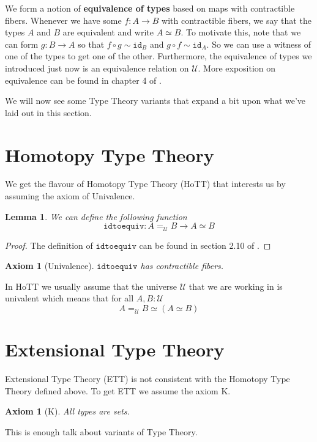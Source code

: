 \documentclass[12pt]{report}
\newtheorem{lem}[thm]{Lemma}
\newtheorem{axiom}[thm]{Axiom}
\begin{document}
 	We form a notion of \textbf{equivalence of types} based on maps with contractible fibers. 
 	Whenever we have some $f : A\rightarrow B$ with contractible fibers, we say that the types $A$ and $B$ are equivalent and write $A \simeq B$. 
 	To motivate this, note that we can form $g : B \rightarrow A$ so that $f\circ g \sim \mathtt{id}_B$ and $g\circ f \sim \mathtt{id}_A$. 
 	So we can use a witness of one of the types to get one of the other. 
 	Furthermore, the equivalence of types we introduced just now is an equivalence relation on $\mathcal{U}$. 
 	More exposition on equivalence can be found in chapter 4 of \cite{hottbook}.

 	We will now see some Type Theory variants that expand a bit upon what we've laid out in this section.

\section{Homotopy Type Theory}
We get the flavour of Homotopy Type Theory (HoTT) that interests us by assuming the axiom of Univalence.
\begin{lem}
We can define the following function
$$\mathtt{idtoequiv} : A=_\mathcal{U}B \rightarrow A\simeq B$$
\end{lem}
\begin{proof}
The definition of $\mathtt{idtoequiv}$ can be found in section 2.10 of \cite{hottbook}. 
\end{proof}

\begin{axiom}[Univalence]
$\mathtt{idtoequiv}$ has contractible fibers.
\end{axiom}
In HoTT we usually assume that the universe $\mathcal{U}$ that we are working in is univalent which means that for all $A,B: \mathcal{U}$
$$A=_\mathcal{U}B \simeq (A \simeq B)$$

\section{Extensional Type Theory}
Extensional Type Theory (ETT) is not consistent with the Homotopy Type Theory defined above. 
To get ETT we assume the axiom K.
\begin{axiom}[K]
All types are sets.
\end{axiom}

This is enough talk about variants of Type Theory.
\end{document}
